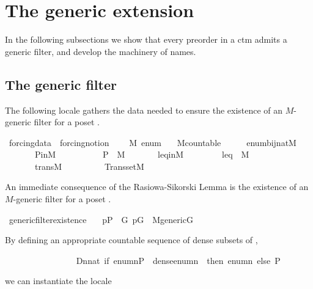 \section{The generic extension}
In the following subsections we show that every preorder in a ctm
admits a generic filter, and develop the machinery of names.

\subsection{The generic filter}
\label{sec:generic-filter}
The following locale gathers the data needed to ensure the 
existence of an $M$-generic filter for a poset .

\begin{isabelle}
\isamarkupfalse%
\ forcing{\isacharunderscore}data\ {\isacharequal}\ forcing{\isacharunderscore}notion\ {\isacharplus}\isanewline
\ \ \ M\ enum\isanewline
\ \ \ M{\isacharunderscore}countable{\isacharcolon}\ \ \ \ \ \ {\isachardoublequoteopen}enum{\isasymin}bij{\isacharparenleft}nat{\isacharcomma}M{\isacharparenright}{\isachardoublequoteclose}\isanewline
\ \ \ \ \ \ \ P{\isacharunderscore}in{\isacharunderscore}M{\isacharcolon}\ \ \ \ \ \ \ \ \ \ \ {\isachardoublequoteopen}P\ {\isasymin}\ M{\isachardoublequoteclose}\isanewline
\ \ \ \ \ \ \ leq{\isacharunderscore}in{\isacharunderscore}M{\isacharcolon}\ \ \ \ \ \ \ \ \ {\isachardoublequoteopen}leq\ {\isasymin}\ M{\isachardoublequoteclose}\isanewline
\ \ \ \ \ \ \ trans{\isacharunderscore}M{\isacharcolon}\ \ \ \ \ \ \ \ \ \ {\isachardoublequoteopen}Transset{\isacharparenleft}M{\isacharparenright}{\isachardoublequoteclose}
\end{isabelle}

An immediate consequence of the Rasiowa-Sikorski Lemma is the
existence of an $M$-generic filter for a poset .

\begin{isabellebody}
\isanewline
{}\isamarkupfalse%
\ generic{\isacharunderscore}filter{\isacharunderscore}existence{\isacharcolon}\ \isanewline
\ \ {\isachardoublequoteopen}p{\isasymin}P\ {\isasymLongrightarrow}\ {\isasymexists}G{\isachardot}\ p{\isasymin}G\ {\isasymand}\ M{\isacharunderscore}generic{\isacharparenleft}G{\isacharparenright}{\isachardoublequoteclose}\isanewline
\end{isabellebody}

By defining an appropriate countable sequence of dense subsets of ,
\begin{isabellebody}
\isanewline
\ \ \isamarkupfalse%
\isanewline
\ \ \ \ \ \ \ \ \ \ \ \ \ \ {\isacharquery}D{\isacharequal}{\isachardoublequoteopen}{\isasymlambda}n{\isasymin}nat{\isachardot}\ {\isacharparenleft}if\ {\isacharparenleft}enum{\isacharbackquote}n{\isasymsubseteq}P\ {\isasymand}\ dense{\isacharparenleft}enum{\isacharbackquote}n{\isacharparenright}{\isacharparenright}\ \ then\ enum{\isacharbackquote}n\ else\ P{\isacharparenright}{\isachardoublequoteclose}\isanewline
\end{isabellebody}
\noindent we can instantiate the locale 


